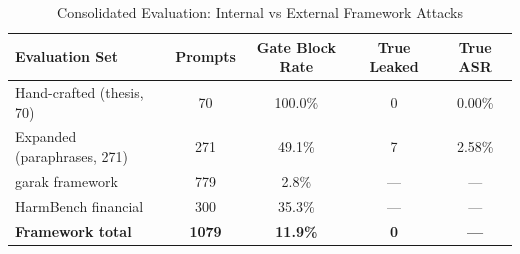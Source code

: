 \begin{table}[htbp]
\centering
\caption{Consolidated Evaluation: Internal vs External Framework Attacks}
\label{tab:external_framework}
\begin{tabular}{lcccc}
\toprule
\textbf{Evaluation Set} & \textbf{Prompts} & \textbf{Gate Block Rate} & \textbf{True Leaked} & \textbf{True ASR} \\
\midrule
  Hand-crafted (thesis, 70) & 70 & 100.0\% & 0 & 0.00\% \\
  Expanded (paraphrases, 271) & 271 & 49.1\% & 7 & 2.58\% \\
  garak framework & 779 & 2.8\% & --- & --- \\
  HarmBench financial & 300 & 35.3\% & --- & --- \\
\midrule
  \textbf{Framework total} & \textbf{1079} & \textbf{11.9\%} & \textbf{0} & \textbf{---} \\
\bottomrule
\end{tabular}
\end{table}
